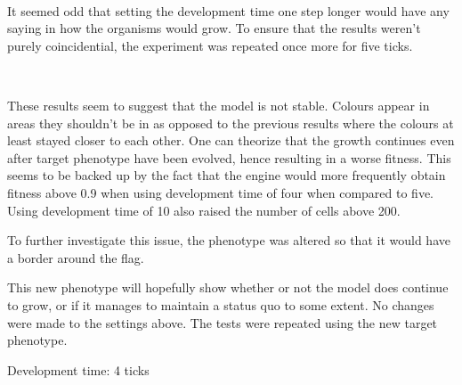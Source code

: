 \begin{center}
	~
	~
\end{center}

It seemed odd that setting the development time one step longer would have any saying in how the organisms would grow. To ensure that the results weren't purely coincidential, the experiment was repeated once more for five ticks.

\begin{center}
	~
	~
\end{center}

These results seem to suggest that the model is not stable. Colours appear in areas they shouldn't be in as opposed to the previous results where the colours at least stayed closer to each other. One can theorize that the growth continues even after target phenotype have been evolved, hence resulting in a worse fitness. This seems to be backed up by the fact that the engine would more frequently obtain fitness above 0.9 when using development time of four when compared to five. Using development time of 10 also raised the number of cells above 200.

To further investigate this issue, the phenotype was altered so that it would have a border around the flag.

\begin{center}\end{center}

This new phenotype will hopefully show whether or not the model does continue to grow, or if it manages to maintain a status quo to some extent. No changes were made to the settings above. The tests were repeated using the new target phenotype.

\begin{center}
	Development time: 4 ticks\newline
	~
\end{center}

